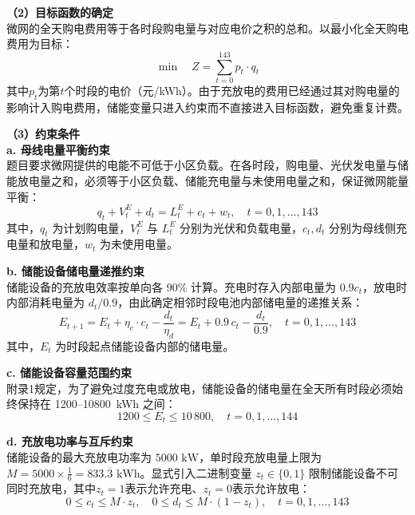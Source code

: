 \documentclass[12pt,a4paper]{ctexart}
\theoremstyle{definition}
\theoremstyle{plain}
\theoremstyle{remark}
\begin{document}
\noindent\textbf{（2）目标函数的确定}\\[6pt]
\indent 微网的全天购电费用等于各时段购电量与对应电价之积的总和。以最小化全天购电费用为目标：
\begin{equation}
  \min \quad Z = \sum_{t=0}^{143} p_t \cdot q_t
  \label{eq:q1_obj}
\end{equation}
\noindent 其中$p_t$为第$t$个时段的电价（元/kWh）。由于充放电的费用已经通过其对购电量的影响计入购电费用，储能变量只进入约束而不直接进入目标函数，避免重复计费。

\noindent\textbf{（3）约束条件}\\[6pt]
\noindent\textbf{a. 母线电量平衡约束}\\[4pt]
\indent 题目要求微网提供的电能不可低于小区负载。在各时段，购电量、光伏发电量与储能放电量之和，必须等于小区负载、储能充电量与未使用电量之和，保证微网能量平衡：
\begin{equation}
  q_t + V_t^{E} + d_t = L_t^{E} + c_t + w_t, \quad t = 0, 1, \ldots, 143
  \label{eq:q1_bus_balance}
\end{equation}
其中，$q_t$ 为计划购电量，$V_t^{E}$ 与 $L_t^{E}$ 分别为光伏和负载电量，$c_t, d_t$ 分别为母线侧充电量和放电量，$w_t$ 为未使用电量。

\noindent\textbf{b. 储能设备储电量递推约束}\\[4pt]
\indent 储能设备的充放电效率按单向各 $90\%$ 计算。充电时存入内部电量为 $0.9 c_t$，放电时内部消耗电量为 $d_t / 0.9$，由此确定相邻时段电池内部储电量的递推关系：
\begin{equation}
  E_{t+1} = E_t + \eta_c \cdot c_t - \frac{d_t}{\eta_d} = E_t + 0.9 \, c_t - \frac{d_t}{0.9}, \quad t = 0, 1, \ldots, 143
  \label{eq:q1_soc_dynamics}
\end{equation}
其中，$E_t$ 为时段起点储能设备内部的储电量。

\noindent\textbf{c. 储能设备容量范围约束}\\[4pt]
\indent 附录1规定，为了避免过度充电或放电，储能设备的储电量在全天所有时段必须始终保持在 1200--10800~kWh 之间：
\begin{equation}
  1200 \leq E_t \leq 10\,800, \quad t = 0, 1, \ldots, 144
  \label{eq:q1_soc_bounds}
\end{equation}

\noindent\textbf{d. 充放电功率与互斥约束}\\[4pt]
\indent 储能设备的最大充放电功率为 $5000\text{ kW}$，单时段充放电量上限为 $M = 5000 \times \frac{1}{6} = 833.\overline{3}\text{ kWh}$。显式引入二进制变量 $z_t \in \{0, 1\}$ 限制储能设备不可同时充放电，其中$z_t=1$表示允许充电、$z_t=0$表示允许放电：
\begin{equation}
  0 \leq c_t \leq M \cdot z_t, \quad 0 \leq d_t \leq M \cdot (1 - z_t), \quad t = 0, 1, \ldots, 143
  \label{eq:q1_charge_discharge_limit}
\end{equation}
\end{document}
